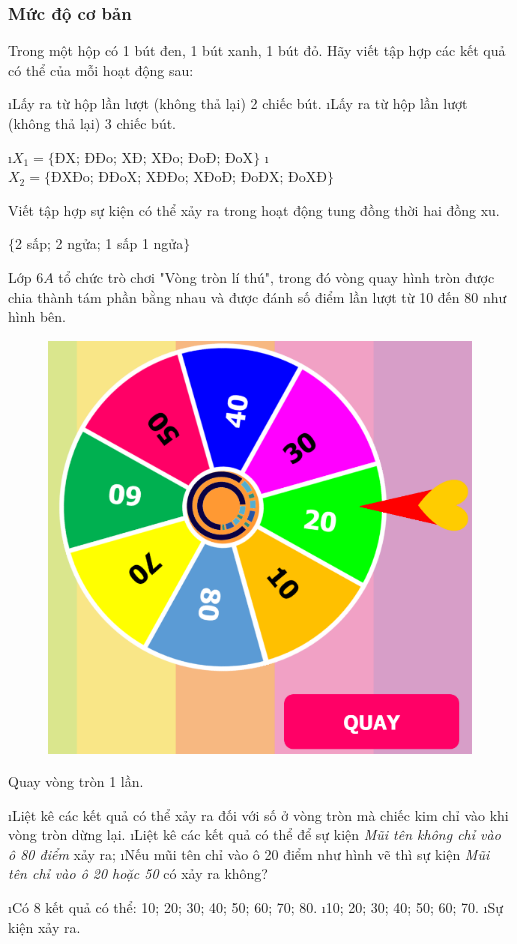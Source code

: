\subsubsection*{Mức độ cơ bản}
\begin{bt}
	Trong một hộp có 1 bút đen, 1 bút xanh, 1 bút đỏ. Hãy viết tập hợp các kết quả có thể của mỗi hoạt động sau: 
	\begin{enumerate}[a),leftmargin=*]
		\i Lấy ra từ hộp lần lượt (không thả lại) 2 chiếc bút.
		\i Lấy ra từ hộp lần lượt (không thả lại) 3 chiếc bút.
	\end{enumerate}
	\begin{loigiaichuong41}
		\begin{enumerate}[a),leftmargin=*]
			\i $X_1 = \{\text{ĐX; ĐĐo; XĐ; XĐo; ĐoĐ; ĐoX}\}$
			\i $X_2 = \{\text{ĐXĐo; ĐĐoX; XĐĐo; XĐoĐ; ĐoĐX; ĐoXĐ}\}$
		\end{enumerate}
	\end{loigiaichuong41}
\end{bt}
\begin{bt}
	Viết tập hợp sự kiện có thể xảy ra trong hoạt động tung đồng thời hai đồng xu.	
	\begin{loigiaichuong41}
	$\{$2 sấp; 2 ngửa; 1 sấp 1 ngửa$\}$
	\end{loigiaichuong41}
\end{bt}
\begin{bt}
	Lớp $6A$ tổ chức trò chơi "Vòng tròn lí thú", trong đó vòng quay hình tròn được chia thành tám phần bằng nhau và được đánh số điểm lần lượt từ 10 đến 80 như hình bên.
	\begin{figure}[H]
		\centering
		\vspace*{-5pt}
		\captionsetup{labelformat= empty, justification=centering}
		\includegraphics[width=0.35\linewidth]{16}
		\vspace*{-10pt}
	\end{figure}
	Quay vòng tròn 1 lần.
	\begin{enumerate}[a),leftmargin=*]
		\i Liệt kê các kết quả có thể xảy ra đối với số ở vòng tròn mà chiếc kim chỉ vào khi vòng tròn dừng lại.
		\i Liệt kê các kết quả có thể để sự kiện \textit{Mũi tên không chỉ vào ô 80 điểm} xảy ra;
		\i Nếu mũi tên chỉ vào ô 20 điểm như hình vẽ thì sự kiện \textit{Mũi tên chỉ vào ô 20 hoặc 50} có xảy ra không?
	\end{enumerate}
	\begin{loigiaichuong41}
		\begin{enumerate}[a),leftmargin=*]
			\i Có 8 kết quả có thể: 10; 20; 30; 40; 50; 60; 70; 80.
			\i 10; 20; 30; 40; 50; 60; 70.
			\i Sự kiện xảy ra.
		\end{enumerate}
	\end{loigiaichuong41}
\end{bt}
